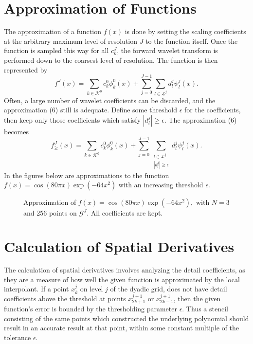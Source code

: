 \documentclass[11pt]{article}
\begin{document}
\section{Approximation of Functions}
The approximation of a function $f(x)$ is done by setting the scaling coefficients at the arbitrary maximum level of 
resolution $J$ to the function itself. Once the function is sampled this way for all $c_{k}^{J}$, the forward wavelet transform is 
performed down to the coarsest level of resolution. The function is then represented by 
\begin{equation}
        f^J(x)=\sum_{k \in \mathcal{K}^0} c_{k}^{0} \phi_{k}^{0}(x) + \sum_{j=0}^{J-1} \sum_{l \in \mathcal{L}^j}
                d_{l}^{j} \psi_{l}^{j}(x).
\end{equation}
Often, a large number of wavelet coefficients can be discarded, and the approximation (6) still is adequate. Define some threshold $\epsilon$ for the coefficients, then keep only those coefficients which satisfy $|d_{l}^{j}| \geq \epsilon$. The approximation (6) becomes 
\begin{equation}
        f_{\geq}^{J}(x)=\sum_{k \in \mathcal{K}^0} c_{k}^{0} \phi_{k}^{0}(x) + \sum_{j=0}^{J-1} \sum_{ \substack{ l \in \mathcal{L}^j \\ |d_{l}^{j}| \geq \epsilon} } d_{l}^{j} \psi_{l}^{j}(x).
\end{equation}
In the figures below are approximations to the function $f(x)=\cos{(80 \pi x)} \exp{(-64 x^2)}$ with an increasing threshold 
$\epsilon$.
\begin{figure}[H]
	\center
	
	\caption{Approximation of $f(x)=\cos{(80 \pi x)} \exp{(-64 x^2)},$ with $N=3$ and 256 points on $\mathcal{G}^J$. All coefficients are kept.}
\end{figure}

\section{Calculation of Spatial Derivatives}
The calculation of spatial derivatives involves analyzing the detail coefficients, as they are a measure of how well the 
given function is approximated by the local interpolant. If a point $x_{k}^{j}$ on level $j$ of the dyadic grid, does not have 
detail coefficients above the threshold at points $x_{2k+1}^{j+1}$ or $x_{2k-1}^{j+1}$, then the given function's error is
bounded by the thresholding parameter $\epsilon$.  Thus a stencil consisting of the same points
which constructed the underlying polynomial should result in an accurate result at that point, 
within some constant multiple of the tolerance $\epsilon$.
\end{document}
